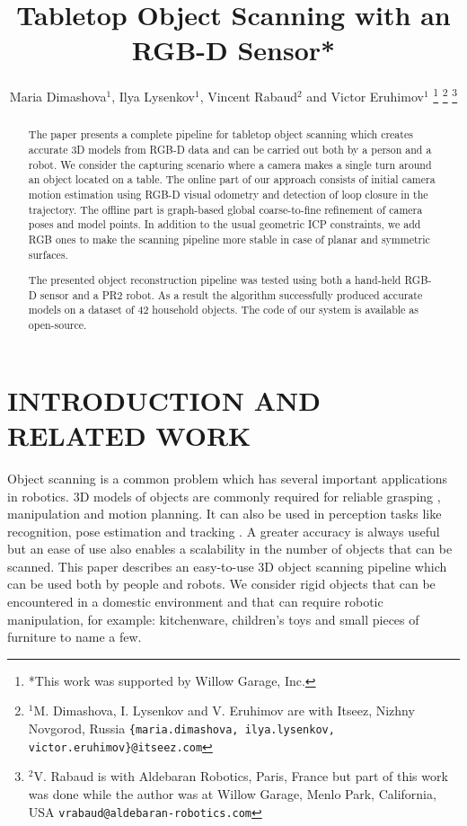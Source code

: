\documentclass[letterpaper, 10 pt, conference]{ieeeconf}  %
\title{\LARGE \bf
Tabletop Object Scanning with an RGB-D Sensor*
}
\author{Maria Dimashova$^{1}$, Ilya Lysenkov$^{1}$, Vincent Rabaud$^{2}$ and Victor Eruhimov$^{1}$
\thanks{*This work was supported by Willow Garage, Inc.}%
\thanks{$^{1}$M. Dimashova, I. Lysenkov and V. Eruhimov are with Itseez, Nizhny Novgorod, Russia
        {\tt\small \{maria.dimashova, ilya.lysenkov, victor.eruhimov\}@itseez.com}}%
\thanks{$^{2}$V. Rabaud is with Aldebaran Robotics, Paris, France but part of this work was done while the author was 
at Willow Garage, Menlo Park, California, USA {\tt\small vrabaud@aldebaran-robotics.com}}%
}
\begin{document}
\maketitle
\thispagestyle{empty}
\pagestyle{empty}


\begin{abstract}
The paper presents a complete pipeline for tabletop object scanning
which creates accurate 3D models from RGB-D data and can be carried out both by a person
and a robot. We consider the capturing scenario where a camera makes
a single turn around an object located on a table. The online part of our approach consists 
of initial camera motion estimation using RGB-D visual
odometry and detection of loop closure in the trajectory. The offline part
is graph-based global coarse-to-fine refinement of camera poses and model points.
In addition to the usual geometric ICP constraints, we add
RGB ones to make the scanning pipeline more stable in case 
of planar and symmetric surfaces. 

The presented object reconstruction pipeline was tested using both a hand-held RGB-D sensor and a PR2 robot.
As a result the algorithm successfully produced accurate models on a dataset of 42 household objects.
The code of our system is available as open-source.

\end{abstract}


\section{INTRODUCTION AND RELATED WORK}

Object scanning is a common problem which has several important applications in robotics.
3D models of objects are commonly required for reliable grasping \cite{miller2004graspit, sahbani2012overview},
manipulation and motion planning. It can also be used in perception tasks like recognition, pose estimation and tracking \cite{klank2009real, hinterstoisser2012accv}.
A greater accuracy is always useful but an ease of use also enables a scalability
in the number of objects that can be scanned.
This paper describes an easy-to-use 3D object scanning pipeline
which can be used both by people and robots.
We consider rigid objects that can be encountered
in a domestic environment and that can require robotic manipulation, for example:
kitchenware, children's toys and small pieces of furniture to name a few.
\end{document}
